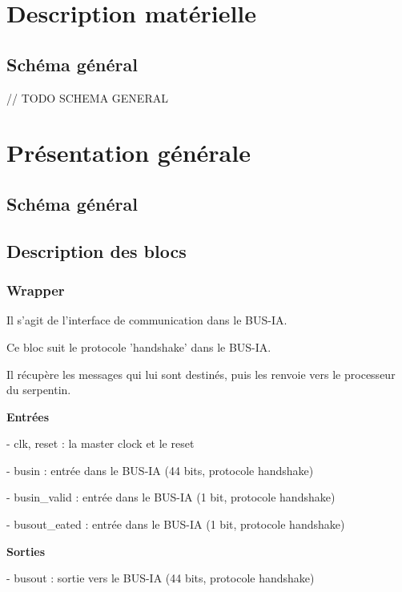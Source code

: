 \documentclass[10pt]{article}
\begin{document}
    \newpage
    \section{Description matérielle}
    
        \subsection{Schéma général}
        
        // TODO SCHEMA GENERAL
    
    \newpage
    \section{Présentation générale}
        \subsection{Schéma général}
        \subsection{Description des blocs}
        
        \subsubsection{Wrapper}
        
        Il s'agit de l'interface de communication dans le BUS-IA.
        
        Ce bloc suit le protocole 'handshake' dans le BUS-IA.
        
        Il récupère les messages qui lui sont destinés,
        puis les renvoie vers le processeur du serpentin.
        
        \textbf{Entrées}
        
            - clk, reset : la master clock et le reset
            
            - busin : entrée dans le BUS-IA (44 bits, protocole handshake)
            
            - busin\_valid : entrée dans le BUS-IA (1 bit, protocole handshake)

            - busout\_eated : entrée dans le BUS-IA (1 bit, protocole handshake)
                            
        \textbf{Sorties}
            
            - busout : sortie vers le BUS-IA (44 bits, protocole handshake)
           
\end{document}

